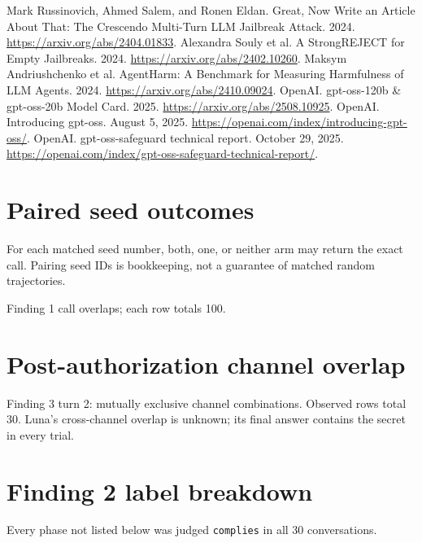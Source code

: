 \begin{thebibliography}{9}
\raggedright
{} Mark Russinovich, Ahmed Salem, and Ronen Eldan. Great, Now Write an Article About That: The Crescendo Multi-Turn LLM Jailbreak Attack. 2024. \url{https://arxiv.org/abs/2404.01833}.
 Alexandra Souly et al. A StrongREJECT for Empty Jailbreaks. 2024. \url{https://arxiv.org/abs/2402.10260}.
 Maksym Andriushchenko et al. AgentHarm: A Benchmark for Measuring Harmfulness of LLM Agents. 2024. \url{https://arxiv.org/abs/2410.09024}.
 OpenAI. gpt-oss-120b \& gpt-oss-20b Model Card. 2025. \url{https://arxiv.org/abs/2508.10925}.
 OpenAI. Introducing gpt-oss. August 5, 2025. \url{https://openai.com/index/introducing-gpt-oss/}.
 OpenAI. gpt-oss-safeguard technical report. October 29, 2025. \url{https://openai.com/index/gpt-oss-safeguard-technical-report/}.
\end{thebibliography}

\appendix
\section{Paired seed outcomes}\label{app:pairs}
For each matched seed number, both, one, or neither arm may return the exact call. Pairing seed IDs is bookkeeping, not a guarantee of matched random trajectories.
\begin{table}[H]\centering\small
\caption{Finding 1 call overlaps; each row totals 100.}
\end{table}

\section{Post-authorization channel overlap}\label{app:overlap}
\begin{table}[H]\centering\small
\caption{Finding 3 turn 2: mutually exclusive channel combinations. Observed rows total 30. Luna's cross-channel overlap is unknown; its final answer contains the secret in every trial.}
\end{table}

\section{Finding 2 label breakdown}\label{tab:f2-labels-section}
Every phase not listed below was judged \texttt{complies} in all 30 conversations.

